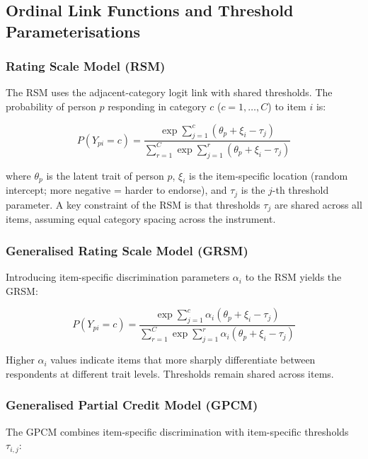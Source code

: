 \documentclass[
  man,
  floatsintext,
  longtable,
  nolmodern,
  notxfonts,
  notimes,
  colorlinks=true,linkcolor=blue,citecolor=blue,urlcolor=blue]{apa7}
\begin{document}
\subsection{Ordinal Link Functions and Threshold
Parameterisations}\label{ordinal-link-functions-and-threshold-parameterisations}

\subsubsection{Rating Scale Model (RSM)}\label{rating-scale-model-rsm}

The RSM uses the adjacent-category logit link with shared thresholds.
The probability of person \(p\) responding in category \(c\)
(\(c = 1, \ldots, C\)) to item \(i\) is:

\[
P(Y_{pi} = c) = \frac{\exp \sum_{j=1}^{c} (\theta_p + \xi_i - \tau_j)}{\sum_{r=1}^{C} \exp \sum_{j=1}^{r} (\theta_p + \xi_i - \tau_j)}
\]

where \(\theta_p\) is the latent trait of person \(p\), \(\xi_i\) is the
item-specific location (random intercept; more negative = harder to
endorse), and \(\tau_j\) is the \(j\)-th threshold parameter. A key
constraint of the RSM is that thresholds \(\tau_j\) are shared across
all items, assuming equal category spacing across the instrument.

\subsubsection{Generalised Rating Scale Model
(GRSM)}\label{generalised-rating-scale-model-grsm}

Introducing item-specific discrimination parameters \(\alpha_i\) to the
RSM yields the GRSM:

\[
P(Y_{pi} = c) = \frac{\exp \sum_{j=1}^{c} \alpha_i(\theta_p + \xi_i - \tau_j)}{\sum_{r=1}^{C} \exp \sum_{j=1}^{r} \alpha_i(\theta_p + \xi_i - \tau_j)}
\]

Higher \(\alpha_i\) values indicate items that more sharply
differentiate between respondents at different trait levels. Thresholds
remain shared across items.

\subsubsection{Generalised Partial Credit Model
(GPCM)}\label{generalised-partial-credit-model-gpcm}

The GPCM combines item-specific discrimination with item-specific
thresholds \(\tau_{i,j}\):
\end{document}
